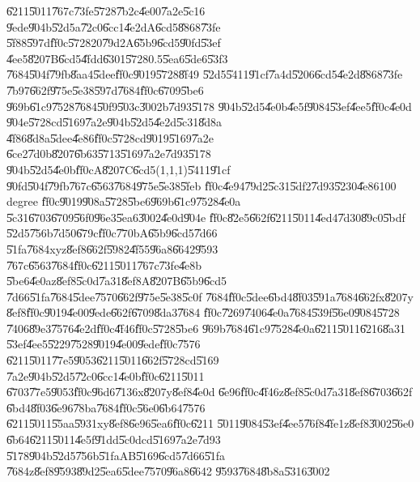 \U{6211}\U{5011}\U{767c}\U{73fe}\U{5728}\U{7b2c}\U{4e00}\U{7a2e}\U{5c16}%
\U{9ede}\U{904b}\U{52d5}a\U{72c0}\U{6cc1}\U{4e2d}A\U{6cd5}\U{8868}\U{73fe}%
\U{5f88}\U{597d}\U{ff0c}\U{5728}20\U{79d2}A\U{65b9}\U{6cd5}\U{90fd}\U{53ef}%
\U{4ee5}\U{8207}B\U{6cd5}\U{4fdd}\U{6301}\U{5728}0.5\U{5ea6}\U{5de6}\U{53f3}%
\U{7684}\U{504f}\U{79fb}\U{8aa4}\U{5dee}\U{ff0c}\U{9019}\U{5728}\U{8f49}%
\U{52d5}\U{5411}\U{91cf}\U{7a4d}\U{5206}\U{6cd5}\U{4e2d}\U{8868}\U{73fe}%
\U{7b97}\U{662f}\U{975e}\U{5e38}\U{597d}\U{7684}\U{ff0c}\U{6709}\U{5be6}%
\U{969b}\U{61c9}\U{7528}\U{7684}\U{50f9}\U{503c}\U{3002}b\U{7d93}\U{5178}%
\U{904b}\U{52d5}\U{4e0b}\U{4e5f}\U{9084}\U{53ef}\U{4ee5}\U{ff0c}\U{4e0d}%
\U{904e}\U{5728}cd\U{5169}\U{7a2e}\U{904b}\U{52d5}\U{4e2d}\U{5c31}\U{8d8a}%
\U{4f86}\U{8d8a}\U{5dee}\U{4e86}\U{ff0c}\U{5728}cd\U{9019}\U{5169}\U{7a2e}%
\U{6ce2}\U{7d0b}\U{8207}\U{6b63}\U{5713}\U{5169}\U{7a2e}\U{7d93}\U{5178}%
\U{904b}\U{52d5}\U{4e0b}\U{ff0c}A\U{8207}C\U{6cd5}(1,1,1)\U{5411}\U{91cf}%
\U{90fd}\U{504f}\U{79fb}\U{767c}\U{6563}\U{7684}\U{975e}\U{5e38}\U{5feb}%
\U{ff0c}\U{4e94}\U{79d2}\U{5c31}\U{5df2}\U{7d93}\U{5230}\U{4e86}100 degree%
\U{ff0c}\U{9019}\U{908a}\U{5728}\U{5be6}\U{969b}\U{61c9}\U{7528}\U{4e0a}%
\U{5c31}\U{6703}\U{6709}\U{56f0}\U{96e3}\U{5ea6}\U{3002}\U{4e0d}\U{904e}%
\U{ff0c}\U{82e5}\U{662f}\U{6211}\U{5011}\U{4ed4}\U{7d30}\U{89c0}\U{5bdf}%
\U{52d5}\U{756b}\U{7d50}\U{679c}\U{ff0c}\U{770b}A\U{65b9}\U{6cd5}\U{7d66}%
\U{51fa}\U{7684}xyz\U{8ef8}\U{662f}\U{5982}\U{4f55}\U{96a8}\U{6642}\U{9593}%
\U{767c}\U{6563}\U{7684}\U{ff0c}\U{6211}\U{5011}\U{767c}\U{73fe}\U{4e8b}%
\U{5be6}\U{4e0a}z\U{8ef8}\U{5c0d}\U{7a31}\U{8ef8}A\U{8207}B\U{65b9}\U{6cd5}%
\U{7d66}\U{51fa}\U{7684}\U{5dee}\U{7570}\U{662f}\U{975e}\U{5e38}\U{5c0f}%
\U{7684}\U{ff0c}\U{5dee}\U{6bd4}\U{8f03}\U{591a}\U{7684}\U{662f}x\U{8207}y%
\U{8ef8}\U{ff0c}\U{9019}\U{4e00}\U{9ede}\U{662f}\U{6709}\U{8da3}\U{7684}%
\U{ff0c}\U{7269}\U{7406}\U{4e0a}\U{7684}\U{539f}\U{56e0}\U{9084}\U{5728}%
\U{7406}\U{89e3}\U{7576}\U{4e2d}\U{ff0c}\U{4f46}\U{ff0c}\U{5728}\U{5be6}%
\U{969b}\U{7684}\U{61c9}\U{7528}\U{4e0a}\U{6211}\U{5011}\U{6216}\U{8a31}%
\U{53ef}\U{4ee5}\U{5229}\U{7528}\U{9019}\U{4e00}\U{9ede}\U{ff0c}\U{7576}%
\U{6211}\U{5011}\U{77e5}\U{9053}\U{6211}\U{5011}\U{662f}\U{5728}cd\U{5169}%
\U{7a2e}\U{904b}\U{52d5}\U{72c0}\U{6cc1}\U{4e0b}\U{ff0c}\U{6211}\U{5011}%
\U{6703}\U{77e5}\U{9053}\U{ff0c}\U{96d6}\U{7136}x\U{8207}y\U{8ef8}\U{4e0d}%
\U{6e96}\U{ff0c}\U{4f46}z\U{8ef8}\U{5c0d}\U{7a31}\U{8ef8}\U{6703}\U{662f}%
\U{6bd4}\U{8f03}\U{6e96}\U{78ba}\U{7684}\U{ff0c}\U{56e0}\U{6b64}\U{7576}%
\U{6211}\U{5011}\U{55aa}\U{5931}xy\U{8ef8}\U{6e96}\U{5ea6}\U{ff0c}\U{6211}%
\U{5011}\U{9084}\U{53ef}\U{4ee5}\U{76f8}\U{4fe1}z\U{8ef8}\U{3002}\U{56e0}%
\U{6b64}\U{6211}\U{5011}\U{4e5f}\U{91dd}\U{5c0d}cd\U{5169}\U{7a2e}\U{7d93}%
\U{5178}\U{904b}\U{52d5}\U{756b}\U{51fa}AB\U{5169}\U{6cd5}\U{7d66}\U{51fa}%
\U{7684}z\U{8ef8}\U{9593}\U{89d2}\U{5ea6}\U{5dee}\U{7570}\U{96a8}\U{6642}%
\U{9593}\U{7684}\U{8b8a}\U{5316}\U{3002}

